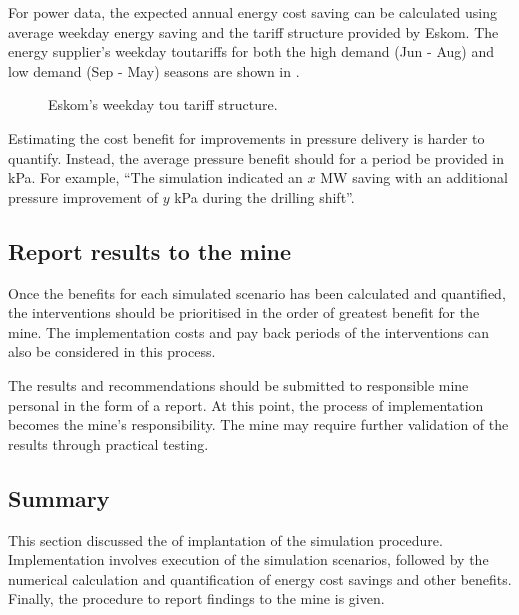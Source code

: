 		For power data, the expected annual energy cost saving can be calculated using average weekday energy saving and the tariff structure provided by Eskom. The energy supplier's weekday \gls{tou}tariffs for both the high demand (Jun - Aug) and low demand (Sep - May) seasons are shown in .

		\begin{figure}[h]
			\centering
			
			\caption[Eskom's weekday TOU tariff structure]{Eskom's weekday \gls{tou} tariff structure.\protect \footnotemark[1]}
			\label{fig: Tariff}
		\end{figure}
		
		Estimating the cost benefit for improvements in pressure delivery is harder to quantify. Instead, the average pressure benefit should for a period be provided in kPa. For example, \enquote{The simulation indicated an $x$ MW saving with an additional pressure improvement of $y$ kPa during the drilling shift}.

		\subsection{Report results to the mine}
		Once the benefits for each simulated scenario has been calculated and quantified, the interventions should be prioritised in the order of greatest benefit for the mine. The implementation costs and pay back periods of the interventions can also be considered in this process.
		\par
		The results and recommendations should be submitted to responsible mine personal in the form of a report. At this point, the process of implementation becomes the mine's responsibility. The mine may require further validation of the results through practical testing.

	\subsection{Summary}
	This section discussed the of implantation of the simulation procedure. Implementation involves execution of the simulation scenarios, followed by the numerical calculation and quantification of energy cost savings and other benefits. Finally, the procedure to report findings to the mine is given.
